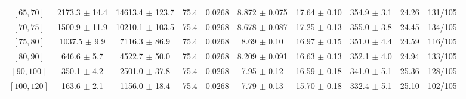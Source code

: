 \begin{tabular}{c||c|c|c|c|c|c|c||c|c}
$[65, 70]$ & 2173.3 $\pm$ 14.4 & 14613.4 $\pm$ 123.7 & 75.4 & 0.0268 & 8.872 $\pm$ 0.075 & 17.64 $\pm$ 0.10 & 354.9 $\pm$ 3.1 & 24.26 & 131/105\\
$[70, 75]$ & 1500.9 $\pm$ 11.9 & 10210.1 $\pm$ 103.5 & 75.4 & 0.0268 & 8.678 $\pm$ 0.087 & 17.25 $\pm$ 0.13 & 355.0 $\pm$ 3.8 & 24.45 & 134/105\\
$[75, 80]$ & 1037.5 $\pm$ 9.9 & 7116.3 $\pm$ 86.9 & 75.4 & 0.0268 & 8.69 $\pm$ 0.10 & 16.97 $\pm$ 0.15 & 351.0 $\pm$ 4.4 & 24.59 & 116/105\\
$[80, 90]$ & 646.6 $\pm$ 5.7 & 4522.7 $\pm$ 50.0 & 75.4 & 0.0268 & 8.209 $\pm$ 0.091 & 16.63 $\pm$ 0.13 & 352.1 $\pm$ 4.0 & 24.94 & 133/105\\
$[90, 100]$ & 350.1 $\pm$ 4.2 & 2501.0 $\pm$ 37.8 & 75.4 & 0.0268 & 7.95 $\pm$ 0.12 & 16.59 $\pm$ 0.18 & 341.0 $\pm$ 5.1 & 25.36 & 128/105\\
$[100, 120]$ & 163.6 $\pm$ 2.1 & 1156.0 $\pm$ 18.4 & 75.4 & 0.0268 & 7.79 $\pm$ 0.13 & 15.70 $\pm$ 0.18 & 332.4 $\pm$ 5.1 & 25.10 & 102/105\\
\end{tabular}
